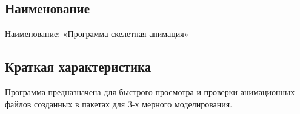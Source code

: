 \subsection{Наименование}
Наименование: «Программа скелетная анимация»

\subsection{Краткая характеристика}
Программа предназначена для быстрого просмотра и проверки анимационных файлов созданных в пакетах для 3-х мерного моделирования.